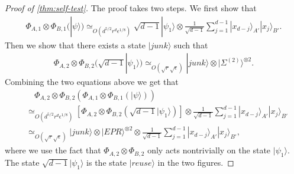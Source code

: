 \documentclass[11pt,letterpaper]{article}
\newcommand{\ket}[1]{|#1\rangle}
\newcommand{\x}{\otimes}
\newcommand{\1}{\mathbb{1}}
\newcommand{\EPR}[1]{\Sigma^{(#1)}}
\newcommand{\ep}{\epsilon}
\newcommand{\se}{\sqrt{\epsilon}}
\newcommand{\sr}{\sqrt{r}}
\newcommand{\appd}[1]{\simeq_{#1}}
\theoremstyle{definition}
\begin{document}
\begin{proof}[Proof of \cref{thm:self-test}]
The proof takes two steps. 
We first show that 
\begin{align}
	\Phi_{A,1}\x\Phi_{B,1}(\ket{\psi}) \appd{O(d^{5/2} r^{d} \ep^{1/8})} \sqrt{d-1}\ket{\psi_1} \x \frac{1}{\sqrt{d-1}}\sum_{j=1}^{d-1} \ket{x_{d-j}}_{A'}\ket{x_j}_{B'}.
\end{align}
Then we show that there exists a state $\ket{junk}$ such that  
\begin{align}
\label{eq:phi2_result}
\Phi_{A,2} \x \Phi_{B,2} (\sqrt{d-1}\ket{\psi_1}) \appd{O(\sr\se)} \ket{junk} \x \ket{\EPR{2}}^{\x 2}.
\end{align}
Combining the two equations above we get that 
\begin{align*}
	&\quad\Phi_{A,2} \x \Phi_{B,2}( \Phi_{A,1} \x \Phi_{B,1} (\ket{\psi})) \\
	&\appd{O(d^{5/2} r^d \ep^{1/8})} \left[\Phi_{A,2} \x \Phi_{B,2}
	(\sqrt{d-1} \ket{\psi_1})\right] \x \frac{1}{\sqrt{d-1}}\sum_{j=1}^{d-1} \ket{x_{d-j}}_{A'}\ket{x_j}_{B'} \\
	&\appd{O(\sr\se)} \ket{junk} \x \ket{EPR}^{\x 2} \x\frac{1}{\sqrt{d-1}}\sum_{j=1}^{d-1} \ket{x_{d-j}}_{A'}\ket{x_j}_{B'},
\end{align*}
where we use the fact that $\Phi_{A,2}\x \Phi_{B,2}$ only 
acts nontrivially on the state $\ket{\psi_1}$.
The state $\sqrt{d-1} \ket{\psi_1}$ is the state
$\ket{reuse}$ in the two figures.


\end{proof}
\end{document}

